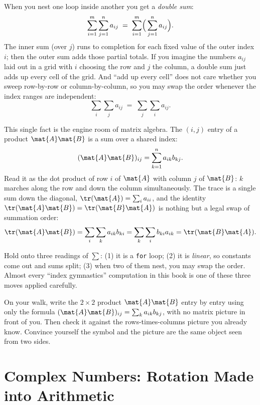 When you nest one loop inside another you get a \emph{double sum}:
\[
\sum_{i=1}^{m}\sum_{j=1}^{n} a_{ij} \;=\; \sum_{i=1}^{m}\Bigl(\,\sum_{j=1}^{n} a_{ij}\Bigr).
\]
The inner sum (over $j$) runs to completion for each fixed value of the outer index $i$; then the
outer sum adds those partial totals. If you imagine the numbers $a_{ij}$ laid out in a grid with $i$
choosing the row and $j$ the column, a double sum just adds up every cell of the grid. And ``add up
every cell'' does not care whether you sweep row-by-row or column-by-column, so you may swap the
order whenever the index ranges are independent:
\[
\sum_{i}\sum_{j} a_{ij} \;=\; \sum_{j}\sum_{i} a_{ij}.
\]

This single fact is the engine room of matrix algebra. The $(i,j)$ entry of a product $\mat{A}\mat{B}$
is a sum over a shared index:
\[
(\mat{A}\mat{B})_{ij} = \sum_{k=1}^{n} a_{ik} b_{kj}.
\]
Read it as the dot product of row $i$ of $\mat{A}$ with column $j$ of $\mat{B}$: $k$ marches along
the row and down the column simultaneously. The trace is a single sum down the diagonal,
$\tr(\mat{A}) = \sum_{i} a_{ii}$, and the identity $\tr(\mat{A}\mat{B}) = \tr(\mat{B}\mat{A})$ is
nothing but a legal swap of summation order:
\[
\tr(\mat{A}\mat{B}) = \sum_i \sum_k a_{ik} b_{ki}
= \sum_k \sum_i b_{ki} a_{ik} = \tr(\mat{B}\mat{A}).
\]

\begin{focusbox}
Hold onto three readings of $\sum$: (1) it is a \texttt{for} loop; (2) it is \emph{linear}, so
constants come out and sums split; (3) when two of them nest, you may swap the order. Almost every
``index gymnastics'' computation in this book is one of these three moves applied carefully.
\end{focusbox}

\begin{walkbox}
On your walk, write the $2\times 2$ product $\mat{A}\mat{B}$ entry by entry using only the formula
$(\mat{A}\mat{B})_{ij} = \sum_k a_{ik}b_{kj}$, with no matrix picture in front of you. Then check it
against the rows-times-columns picture you already know. Convince yourself the symbol and the picture
are the same object seen from two sides.
\end{walkbox}

\section{Complex Numbers: Rotation Made into Arithmetic}
\label{ch39:complex}

